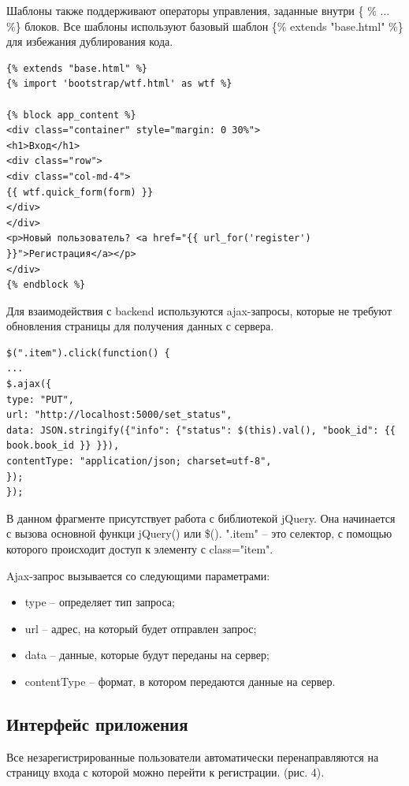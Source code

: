 \documentclass[12pt]{article}
\begin{document}
Шаблоны также поддерживают операторы управления, заданные внутри \{ \% ... \%\} блоков.
Все шаблоны используют базовый шаблон \{\% extends "base.html" \%\} для избежания дублирования кода.

\begin{lstlisting}[label=some-code, caption=Шаблон base.html]
{% extends "base.html" %}
{% import 'bootstrap/wtf.html' as wtf %}

{% block app_content %}
<div class="container" style="margin: 0 30%">
<h1>Вход</h1>
<div class="row">
<div class="col-md-4">
{{ wtf.quick_form(form) }}
</div>
</div>
<p>Новый пользователь? <a href="{{ url_for('register') }}">Регистрация</a></p>
</div>
{% endblock %}
\end{lstlisting}

Для взаимодействия с backend используются ajax-запросы, которые не требуют обновления страницы для получения данных с сервера.

\begin{lstlisting}[label=some-code, caption=Пример части кода с использованием ajax-запроса для изменения статуса книги в БД]
$(".item").click(function() {
...
$.ajax({
type: "PUT",
url: "http://localhost:5000/set_status",
data: JSON.stringify({"info": {"status": $(this).val(), "book_id": {{ book.book_id }} }}),
contentType: "application/json; charset=utf-8",
});
});
\end{lstlisting}

В данном фрагменте присутствует работа с библиотекой jQuery. Она начинается с вызова основной функци jQuery() или \$(). ".item" – это селектор, с помощью которого происходит доступ к элементу с class="item".

Ajax-запрос вызывается со следующими параметрами:
\begin{itemize}
	\item type – определяет тип запроса;
	\item url – адрес, на который будет отправлен запрос;
	\item data – данные, которые будут переданы на сервер;
	\item contentType – формат, в котором передаются данные на сервер.
\end{itemize}


\subsection{Интерфейс приложения}%
\setcounter{subsection}{5}

Все незарегистрированные пользователи автоматически перенаправляются на страницу входа с которой можно перейти к регистрации. (рис. 4).
\end{document}
